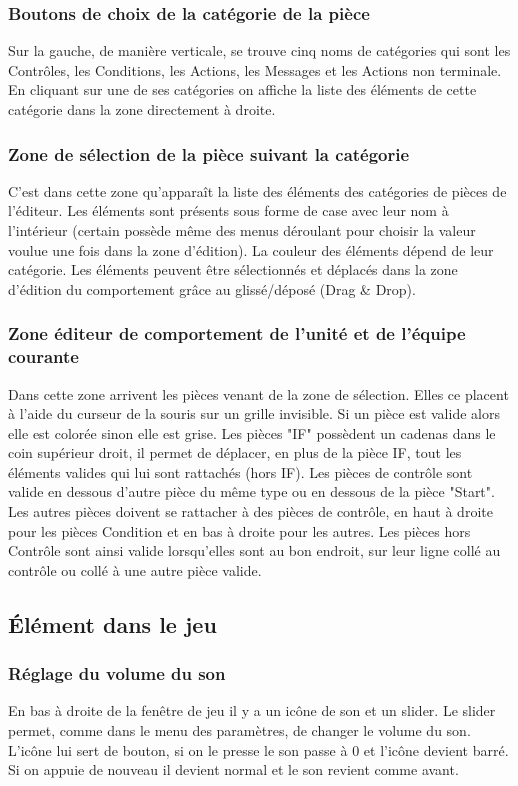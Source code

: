 \documentclass{report}
\begin{document}
\subsubsection{Boutons de choix de la catégorie de la pièce}
Sur la gauche, de manière verticale, se trouve cinq noms de catégories qui sont les Contrôles, les Conditions, les Actions, les Messages et les Actions non terminale. En cliquant sur une de ses catégories on affiche la liste des éléments de cette catégorie dans la zone directement à droite.
\subsubsection{Zone de sélection de la pièce suivant la catégorie}
C'est dans cette zone qu’apparaît la liste des éléments des catégories de pièces de l'éditeur. Les éléments sont présents sous forme de case avec leur nom à l'intérieur (certain possède même des menus déroulant pour choisir la valeur voulue une fois dans la zone d'édition). La couleur des éléments dépend de leur catégorie.
Les éléments peuvent être sélectionnés et déplacés dans la zone d'édition du comportement grâce au glissé/déposé (Drag \& Drop).
\subsubsection{Zone éditeur de comportement de l'unité et de l'équipe courante}
Dans cette zone arrivent les pièces venant de la zone de sélection. Elles ce placent à l'aide du curseur de la souris sur un grille invisible. Si un pièce est valide alors elle est colorée sinon elle est grise. Les pièces "IF" possèdent un cadenas dans le coin supérieur droit, il permet de déplacer, en plus de la pièce IF, tout les éléments valides qui lui sont rattachés (hors IF). Les pièces de contrôle sont valide en dessous d'autre pièce du même type ou en dessous de la pièce "Start". Les autres pièces doivent se rattacher à des pièces de contrôle, en haut à droite pour les pièces Condition et en bas à droite pour les autres. Les pièces hors Contrôle sont ainsi valide lorsqu'elles sont au bon endroit, sur leur ligne collé au contrôle ou collé à une autre pièce valide. 

\subsection{Élément dans le jeu}
\subsubsection{Réglage du volume du son}
En bas à droite de la fenêtre de jeu il y a un icône de son et un slider. Le slider permet, comme dans le menu des paramètres, de changer le volume du son. L’icône lui sert de bouton, si on le presse le son passe à 0 et l’icône devient barré. Si on appuie de nouveau il devient normal et le son revient comme avant.
\end{document}
